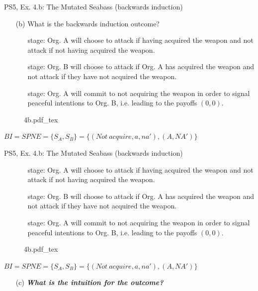 \begin{frame}{PS5, Ex. 4.b: The Mutated Seabass (backwards induction)}
  \begin{itemize}
    \item[(b)] What is the backwards induction outcome?
    \begin{itemize}\normalsize
      \item[\nth{3} stage:] Org. A will choose to attack if having acquired the weapon and not attack if not having acquired the weapon.
      \item[\nth{2} stage:] Org. B will choose to attack if Org. A has acquired the weapon and not attack if they have not acquired the weapon.
      \item[\nth{1} stage:] Org. A will commit to not acquiring the weapon in order to signal peaceful intentions to Org. B, i.e. leading to the payoffs $(0,0)$.
    \end{itemize}
  \end{itemize}
  \vspace{-8pt}
  \begin{figure}[!h]
    \center
    \def\svgwidth{\columnwidth}
    {4b.pdf_tex}
  \end{figure}
  \vspace{-4pt}
  $BI=SPNE=\{S_A,S_B\}=\{ (Not\ acquire, a, na'),(A, NA') \}$
  \vfill\null
\end{frame}
\begin{frame}{PS5, Ex. 4.b: The Mutated Seabass (backwards induction)}
  \vspace{-4pt}
  \begin{itemize}
    \item[]
    \begin{itemize}\normalsize
      \item[\nth{3} stage:] Org. A will choose to attack if having acquired the weapon and not attack if not having acquired the weapon.
      \item[\nth{2} stage:] Org. B will choose to attack if Org. A has acquired the weapon and not attack if they have not acquired the weapon.
      \item[\nth{1} stage:] Org. A will commit to not acquiring the weapon in order to signal peaceful intentions to Org. B, i.e. leading to the payoffs $(0,0)$.
    \end{itemize}
  \end{itemize}
  \vspace{-8pt}
  \begin{figure}[!h]
    \center
    \def\svgwidth{\columnwidth}
    {4b.pdf_tex}
  \end{figure}
  \vspace{-4pt}
  $BI=SPNE=\{S_A,S_B\}=\{ (Not\ acquire, a, na'),(A, NA') \}$
  \vspace{-2pt}
  \begin{itemize}
    \item[(c)] \textbf{\textit{What is the intuition for the outcome?}}
  \end{itemize}
  \vfill\null
\end{frame}

